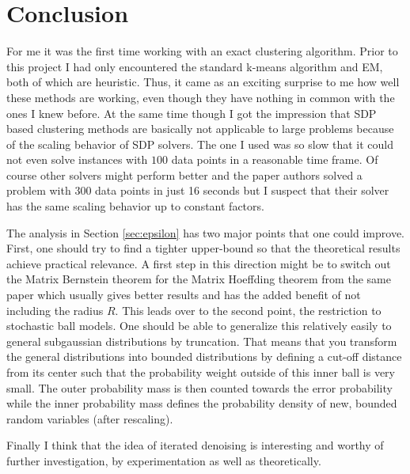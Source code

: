 \documentclass[10pt,a4paper]{article}
\begin{document}
\section{Conclusion}
\label{sec:conclusion}

For me it was the first time working with an exact clustering algorithm.
Prior to this project I had only encountered the standard k-means algorithm and EM, both of which are heuristic.
Thus, it came as an exciting surprise to me how well these methods are working, even though they have nothing in common with the ones I knew before.
At the same time though I got the impression that SDP based clustering methods are basically not applicable to large problems because of the scaling behavior of SDP solvers.
The one I used was so slow that it could not even solve instances with $100$ data points in a reasonable time frame.
Of course other solvers might perform better and the paper authors solved a problem with $300$ data points in just 16 seconds but I suspect that their solver has the same scaling behavior up to constant factors.

The analysis in Section \ref{sec:epsilon} has two major points that one could improve.
First, one should try to find a tighter upper-bound so that the theoretical results achieve practical relevance.
A first step in this direction might be to switch out the Matrix Bernstein theorem for the Matrix Hoeffding theorem from the same paper \cite{tailbounds} which usually gives better results and has the added benefit of not including the radius $R$.
This leads over to the second point, the restriction to stochastic ball models.
One should be able to generalize this relatively easily to general subgaussian distributions by truncation.
That means that you transform the general distributions into bounded distributions by defining a cut-off distance from its center such that the probability weight outside of this inner ball is very small.
The outer probability mass is then counted towards the error probability while the inner probability mass defines the probability density of new, bounded random variables (after rescaling).

Finally I think that the idea of iterated denoising is interesting and worthy of further investigation, by experimentation as well as theoretically.

{}

\end{document}
